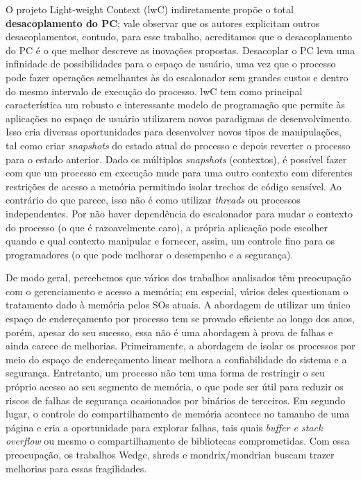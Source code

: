 O projeto  Light-weight Context (lwC) indiretamente propõe o total
\textbf{desacoplamento do PC}; vale observar que os autores explicitam outros
desacoplamentos, contudo, para esse trabalho, acreditamos que o desacoplamento
do PC é o que melhor descreve as inovações propostas. Desacoplar o PC leva uma
infinidade de possibilidades para o espaço de usuário, uma vez que o processo
pode fazer operações semelhantes às do escalonador sem grandes custos e dentro
do mesmo intervalo de execução do processo. lwC tem como principal
característica um robusto e interessante modelo de programação que permite
às aplicações no espaço de usuário utilizarem novos paradigmas de desenvolvimento.
Isso cria diversas oportunidades para desenvolver novos tipos de manipulações,
tal como criar \emph{snapshots} do estado atual do processo e depois reverter o
processo para o estado anterior. Dado os múltiplos \emph{snapshots}
(contextos), é possível fazer com que um processo em execução mude para uma
outro contexto com diferentes restrições de acesso a memória permitindo isolar
trechos de código sensível.  Ao contrário do que parece, isso não é como
utilizar \emph{threads} ou processos independentes. Por não haver dependência
do escalonador para mudar o contexto do processo (o que é razoavelmente caro),
a própria aplicação pode escolher quando e qual contexto manipular e fornecer,
assim, um controle fino para os programadores (o que pode melhorar o desempenho
e a segurança).

De modo geral, percebemos que vários dos trabalhos analisados têm preocupação com o gerenciamento e acesso a
memória; em especial, vários deles questionam o tratamento dado à memória pelos
SOs atuais.  A abordagem de utilizar um único espaço de endereçamento por
processo tem se provado eficiente ao longo dos anos, porém, apesar do seu
sucesso, essa não é uma abordagem à prova de falhas e ainda carece de
melhorias. Primeiramente, a abordagem de isolar os processos por meio do
espaço de endereçamento linear melhora a confiabilidade do sistema e a
segurança. Entretanto, um processo não tem uma forma de restringir o seu próprio
acesso ao seu segmento de memória, o que pode ser útil para reduzir os riscos de
falhas de segurança ocasionados por binários de terceiros. Em segundo lugar, o
controle do compartilhamento de memória acontece no tamanho de uma página e
cria a oportunidade para explorar falhas, tais quais \emph{buffer e stack
overflow} ou mesmo o compartilhamento de bibliotecas comprometidas. Com essa preocupação, os
trabalhos Wedge, shreds e mondrix/mondrian buscam trazer melhorias para essas fragilidades.

